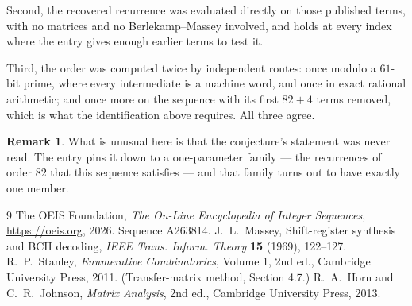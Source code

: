 \documentclass[11pt,a4paper]{article}
\theoremstyle{plain}
\theoremstyle{definition}
\newtheorem{remark}[theorem]{Remark}
\begin{document}
Second, the recovered recurrence was evaluated directly on those published terms, with no
matrices and no Berlekamp--Massey involved, and holds at every index where the entry gives
enough earlier terms to test it.

Third, the order was computed twice by independent routes: once modulo a $61$-bit prime, where
every intermediate is a machine word, and once in exact rational arithmetic; and once more on
the sequence with its first $82+4$ terms removed, which is what the identification above
requires. All three agree.

\begin{remark}
What is unusual here is that the conjecture's statement was never read. The entry pins it down
to a one-parameter family --- the recurrences of order $82$ that this sequence satisfies
--- and that family turns out to have exactly one member.
\end{remark}

\begin{thebibliography}{9}
 The OEIS Foundation, \emph{The On-Line Encyclopedia of Integer
Sequences}, \url{https://oeis.org}, 2026. Sequence A263814.
 J.~L.~Massey, Shift-register synthesis and BCH decoding, \emph{IEEE
Trans. Inform. Theory} \textbf{15} (1969), 122--127.
 R.~P.~Stanley, \emph{Enumerative Combinatorics}, Volume 1, 2nd ed.,
Cambridge University Press, 2011. (Transfer-matrix method, Section 4.7.)
 R.~A.~Horn and C.~R.~Johnson, \emph{Matrix Analysis}, 2nd ed., Cambridge
University Press, 2013.
\end{thebibliography}
\end{document}
